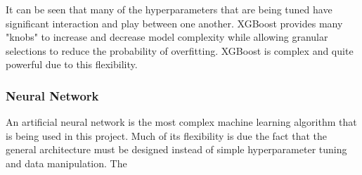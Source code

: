 \documentclass[11pt]{article}
\begin{document}
	It can be seen that many of the hyperparameters that are being tuned have significant interaction and play between one another. XGBoost provides many "knobs" to increase and decrease model complexity while allowing granular selections to reduce the probability of overfitting. XGBoost is complex and quite powerful due to this flexibility.
	
	\subsubsection{Neural Network}
	An artificial neural network is the most complex machine learning algorithm that is being used in this project. Much of its flexibility is due the fact that the general architecture must be designed instead of simple hyperparameter tuning and data manipulation. The 
	
	{}
	
	
\end{document}
